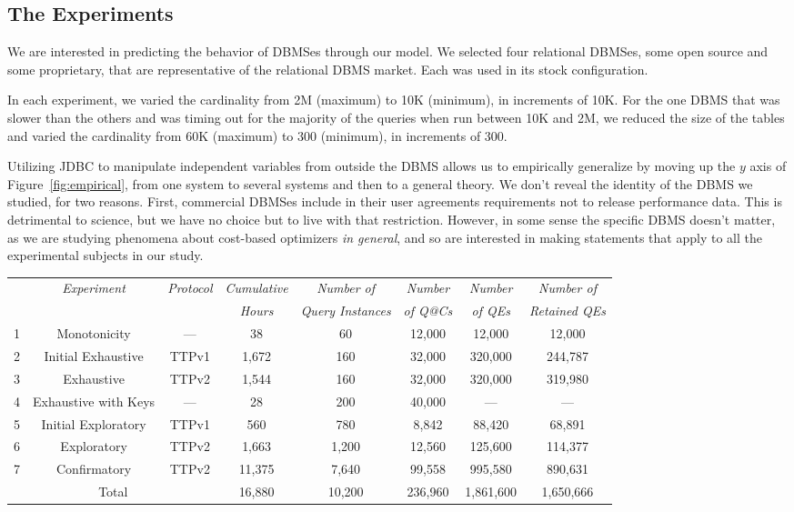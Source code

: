 \documentclass[prodmode,acmtods]{acmsmall}
\begin{document}
\subsection{The Experiments}\label{sec:experiments}

We are interested in predicting the behavior of \hbox{DBMSes} through our
model. We selected four relational
\hbox{DBMSes}, some open source and some proprietary, that are representative of
the relational \hbox{DBMS} market. Each was used in its stock configuration.

In each experiment, we varied the
cardinality from 2M (maximum) to 10K (minimum), in increments of 10K. For
the one \hbox{DBMS} that was slower than the others and was timing out for
the majority of the queries when run between 10K and 2M, we reduced the
size of the tables and varied the cardinality from 60K (maximum) to 300 
(minimum), in increments of 300.

Utilizing JDBC to manipulate independent variables from outside the
  \hbox{DBMS} allows us to empirically generalize by moving up the $y$ axis of
  Figure~\ref{fig:empirical}, from one system to several systems and then to
  a general theory. We don't reveal the identity of the \hbox{DBMS} we studied, for two reasons. First, commercial \hbox{DBMSes}
include in their user agreements requirements not to release 
performance data. This is detrimental to science, but we have no choice but
to live with that restriction. However, in some sense the specific \hbox{DBMS}
doesn't matter, as we are studying phenomena about cost-based optimizers
{\em in general}, and so are interested in making statements that apply to
all the experimental subjects in our study.

\begin{table}[t]
{%
\resizebox{140mm}{!}
{
\begin{tabular}{c|c|c|c|c|c|c|c}
& {\em Experiment}& {\em Protocol} & {\em Cumulative} & {\em Number of}&{\em
    Number} &{\em Number}& {\em Number of}\\
& & & {\em Hours} & {\em Query Instances}&{\em of Q@Cs} &{\em of QEs}&{\em Retained QEs}\\
\hline
1 & Monotonicity 		& --- & 38 & 60 & 12,000 & 12,000 & 12,000\\
2 & Initial Exhaustive 		& TTPv1 & 1,672 & 160 & 32,000 & 320,000 & 244,787\\
3 & Exhaustive 			& TTPv2 & 1,544 & 160 & 32,000 & 320,000 & 319,980\\
4 & Exhaustive with Keys 	& --- & 28 & 200 & 40,000 & --- & ---\\
5 & Initial Exploratory 	& TTPv1 & 560 & 780 & 8,842 & 88,420 & 68,891\\%
6 & Exploratory 		& TTPv2 & 1,663 & 1,200 & 12,560 & 125,600 & 114,377\\
7 & Confirmatory 		& TTPv2 & 11,375 & 7,640 & 99,558 & 995,580 & 890,631\\
\multicolumn{3}{c|}{Total}	& 16,880 & 10,200 & 236,960 & 1,861,600 & 1,650,666\\
\end{tabular}
}
}
\end{table}
\end{document}
